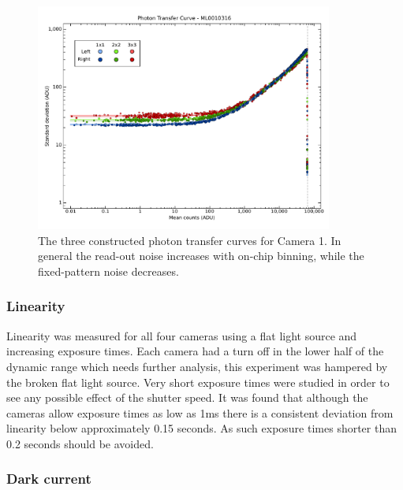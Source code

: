 \begin{colsection}
\begin{colsection}
\begin{figure}
    \begin{center}
        \includegraphics[width=0.87\textwidth]{images/1comb.pdf}
    \end{center}
    \caption[TODO]{
        The three constructed photon transfer curves for Camera 1. In general the read-out noise increases with on-chip binning, while the fixed-pattern noise decreases.
        }\label{fig:ptc}
\end{figure}

\newpage
\subsubsection{Linearity}
Linearity was measured for all four cameras using a flat light source and increasing exposure times. Each camera had a turn off in the lower half of the dynamic range which needs further analysis, this experiment was hampered by the broken flat light source. Very short exposure times were studied in order to see any possible effect of the shutter speed. It was found that although the cameras allow exposure times as low as 1ms there is a consistent deviation from linearity below approximately 0.15 seconds. As such exposure times shorter than 0.2 seconds should be avoided.

\newpage
\subsubsection{Dark current}


\end{colsection}
\end{colsection}
